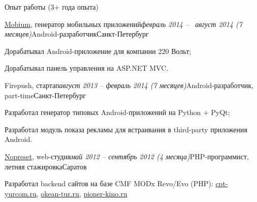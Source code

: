 \documentclass[hidelinks]{resume} %
\begin{document}
\begin{rSection}{Опыт работы (3+ года опыта)}

\begin{rSubsection}{\href{http://mobiumapps.com}{Mobium}, генератор мобильных приложений}{\em февраль 2014 --  август 2014 (7 месяцев)}{Android-разработчик}{Санкт-Петербург}
\item Дорабатывал Android-приложение для компании 220 Вольт;
\item Дорабатывал панель управления на ASP.NET MVC.
\end{rSubsection}


\begin{rSubsection}{Firepush, стартап}{\em август 2013 -- февраль 2014 (7 месяцев)}{Android-разработчик, part-time}{Санкт-Петербург}
\item Разработал генератор типовых Android-приложений на Python + PyQt;
\item Разработал модуль показа рекламы для встраивания в third-party приложения Android.
\end{rSubsection}


\begin{rSubsection}{\href{http://nopreset.ru}{Nopreset}, web-студия}{\em май 2012 -- сентябрь 2012 (4 месяца)}{PHP-программист, летняя стажировка}{Саратов}
\item Разработал backend сайтов на базе CMF MODx Revo/Evo (PHP): \href{http://cpt-yurcom.ru}{cpt-yurcom.ru}, \href{http://okean-tur.ru}{okean-tur.ru}, \href{http://pioner-kino.ru}{pioner-kino.ru}
\end{rSubsection}
\end{rSection}

\end{document}
